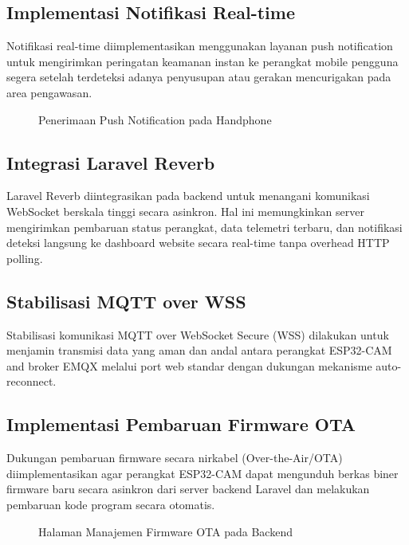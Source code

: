 \subsection{Implementasi Notifikasi Real-time}

Notifikasi real-time diimplementasikan menggunakan layanan push notification untuk mengirimkan peringatan keamanan instan ke perangkat mobile pengguna segera setelah terdeteksi adanya penyusupan atau gerakan mencurigakan pada area pengawasan.

\begin{figure}[H]
\caption{Penerimaan Push Notification pada Handphone}
\label{fig:push_notification}
\end{figure}

\subsection{Integrasi Laravel Reverb}

Laravel Reverb diintegrasikan pada backend untuk menangani komunikasi WebSocket berskala tinggi secara asinkron. Hal ini memungkinkan server mengirimkan pembaruan status perangkat, data telemetri terbaru, dan notifikasi deteksi langsung ke dashboard website secara real-time tanpa overhead HTTP polling.

\subsection{Stabilisasi MQTT over WSS}

Stabilisasi komunikasi MQTT over WebSocket Secure (WSS) dilakukan untuk menjamin transmisi data yang aman dan andal antara perangkat ESP32-CAM and broker EMQX melalui port web standar dengan dukungan mekanisme auto-reconnect.

\subsection{Implementasi Pembaruan Firmware OTA}

Dukungan pembaruan firmware secara nirkabel (Over-the-Air/OTA) diimplementasikan agar perangkat ESP32-CAM dapat mengunduh berkas biner firmware baru secara asinkron dari server backend Laravel dan melakukan pembaruan kode program secara otomatis.

\begin{figure}[H]
\caption{Halaman Manajemen Firmware OTA pada Backend}
\label{fig:ota_management}
\end{figure}

